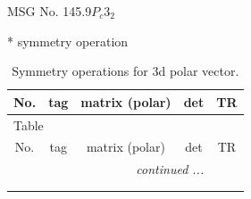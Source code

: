 \documentclass[fleqn,8pt]{jsarticle}
\begin{document}
\setcounter{MaxMatrixCols}{32}

\renewcommand{\tablename}{Table~}
\renewcommand{\figurename}{Figure~}
\begin{center}
\LARGE
MSG No. 145.9\quad$P_{c}3_{2}$
\end{center}
* symmetry operation
\renewcommand{\arraystretch}{1.3}
\begin{longtable}{ccccc}
\caption{Symmetry operations for 3d polar vector.}
 \\
 \hline \hline
No. & tag & matrix (polar) & det & TR \\ \hline \endfirsthead

\multicolumn{4}{l}{\tablename\ \thetable{}} \\
 \hline \hline
No. & tag & matrix (polar) & det & TR \\ \hline \endhead

 \hline \hline
\multicolumn{4}{r}{\footnotesize\it continued ...} \\ \endfoot

 \hline \hline
\multicolumn{4}{r}{} \\ \endlastfoot


\end{longtable}
\end{document}
